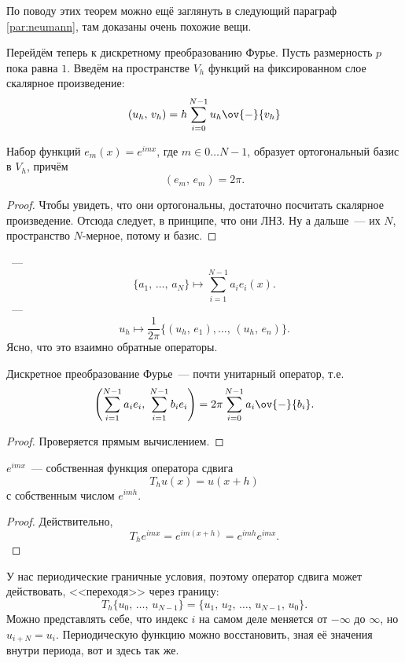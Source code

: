 \documentclass{trlnotes}
\begin{document}
По поводу этих теорем можно ещё заглянуть в следующий параграф \ref{par:neumann}, там доказаны очень похожие вещи.

Перейдём теперь к дискретному преобразованию Фурье. Пусть размерность $p$ пока равна $1$. Введём на пространстве $V_h$ функций на фиксированном слое скалярное произведение:
\[
	(u_h, \, v_h) = h \sum\limits_{i = 0}^{N - 1} u_h \ov{-}{v_h}
\]

\begin{st}
	Набор функций $e_m(x) = e^{imx}$, где $m \in 0\ldots N-1$, образует ортогональный базис в $V_h$, причём
	\[
		(e_m, \, e_m) = 2\pi.
	\]
	\begin{proof}
		Чтобы увидеть, что они ортогональны, достаточно посчитать скалярное произведение. Отсюда следует, в принципе, что они ЛНЗ. Ну а дальше~--- их $N$, пространство $N$-мерное, потому и базис.
	\end{proof}
\end{st}

\begin{de}
	~---
	\[
		\{a_1, \, \ldots, \, a_N\} \mapsto \sum\limits_{i = 1}^{N-1} a_i e_i(x).
	\]
	~---
	\[
		u_h \mapsto \dfrac{1}{2\pi}\big\{(u_h, \, e_1), \ldots, \, (u_h, \, e_n)\big\}.
	\]
	Ясно, что это взаимно обратные операторы.
\end{de}

\begin{st}
	Дискретное преобразование Фурье~--- почти унитарный оператор, т.е. 
	\[
		\left(\sum\limits_{i = 1}^{N - 1} a_i e_i, \; \sum\limits_{i = 1}^{N - 1} b_i e_i\right) = 2 \pi \sum_{i = 0}^{N - 1} a_i \ov{-}{b_i}.
	\]
	\begin{proof}
		Проверяется прямым вычислением.
	\end{proof}
\end{st}

\begin{st}
	$e^{imx}$~--- собственная функция оператора сдвига
	\[
		T_h u(x) = u(x + h)
	\]
	с собственным числом $e^{imh}$.
	\begin{proof}
		Действительно,
		\[
			T_h e^{imx} = e^{im(x + h)} = e^{imh} e^{imx}.
		\]
	\end{proof}
\end{st}

\begin{rem}
	У нас периодические граничные условия, поэтому оператор сдвига может действовать, <<переходя>> через границу:
	\[
		T_h \{u_0, \, \ldots, \, u_{N - 1}\} = \{u_{1}, \, u_2, \, \ldots, \, u_{N-1}, \, u_0\}.
	\]
	Можно представлять себе, что индекс $i$ на самом деле меняется от $-\infty$ до $\infty$, но $u_{i + N} = u_i$. Периодическую функцию можно восстановить, зная её значения внутри периода, вот и здесь так же.
\end{rem}
\end{document}

